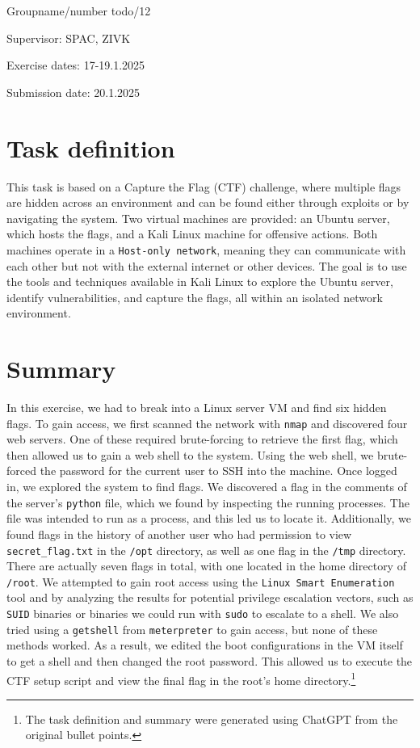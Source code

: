\documentclass[a4paper]{article}
\newcommand{\abc}{\hfill \break}
\begin{document}
Groupname/number todo/12

Supervisor: 	SPAC, ZIVK

Exercise dates: 17-19.1.2025

Submission date: 20.1.2025


\newpage
\tableofcontents

\newpage

\section{Task definition}

This task is based on a Capture the Flag (CTF) challenge, where multiple flags are hidden across an environment and can be found either through exploits or by navigating the system. Two virtual machines are provided: an Ubuntu server, which hosts the flags, and a Kali Linux machine for offensive actions. Both machines operate in a \texttt{Host-only network}, meaning they can communicate with each other but not with the external internet or other devices.\abc
The goal is to use the tools and techniques available in Kali Linux to explore the Ubuntu server, identify vulnerabilities, and capture the flags, all within an isolated network environment.


\section{Summary}
In this exercise, we had to break into a Linux server VM and find six hidden flags. To gain access, we first scanned the network with \texttt{nmap} and discovered four web servers. One of these required brute-forcing to retrieve the first flag, which then allowed us to gain a web shell to the system. Using the web shell, we brute-forced the password for the current user to SSH into the machine. Once logged in, we explored the system to find flags.\abc
We discovered a flag in the comments of the server's \texttt{python} file, which we found by inspecting the running processes. The file was intended to run as a process, and this led us to locate it. Additionally, we found flags in the history of another user who had permission to view \texttt{secret\_flag.txt} in the \texttt{/opt} directory, as well as one flag in the \texttt{/tmp} directory. There are actually seven flags in total, with one located in the home directory of \texttt{/root}.\abc
We attempted to gain root access using the \texttt{Linux Smart Enumeration} tool and by analyzing the results for potential privilege escalation vectors, such as \texttt{SUID} binaries or binaries we could run with \texttt{sudo} to escalate to a shell. We also tried using a \texttt{getshell} from \texttt{meterpreter} to gain access, but none of these methods worked. As a result, we edited the boot configurations in the VM itself to get a shell and then changed the root password. This allowed us to execute the CTF setup script and view the final flag in the root's home directory.\footnote{The task definition and summary were generated using ChatGPT from the original bullet points.}
\newpage
\end{document}
